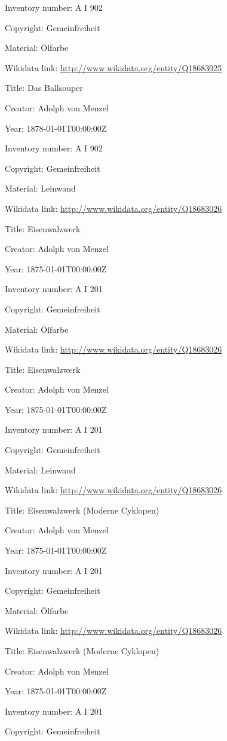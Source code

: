 \documentclass[
  letterpaper,
  DIV=11,
  numbers=noendperiod]{scrartcl}
\begin{document}
Inventory number: A I 902

Copyright: Gemeinfreiheit

Material: Ölfarbe

Wikidata link: \url{http://www.wikidata.org/entity/Q18683025}

Title: Das Ballsouper

Creator: Adolph von Menzel

Year: 1878-01-01T00:00:00Z

Inventory number: A I 902

Copyright: Gemeinfreiheit

Material: Leinwand

Wikidata link: \url{http://www.wikidata.org/entity/Q18683026}

Title: Eisenwalzwerk

Creator: Adolph von Menzel

Year: 1875-01-01T00:00:00Z

Inventory number: A I 201

Copyright: Gemeinfreiheit

Material: Ölfarbe

Wikidata link: \url{http://www.wikidata.org/entity/Q18683026}

Title: Eisenwalzwerk

Creator: Adolph von Menzel

Year: 1875-01-01T00:00:00Z

Inventory number: A I 201

Copyright: Gemeinfreiheit

Material: Leinwand

Wikidata link: \url{http://www.wikidata.org/entity/Q18683026}

Title: Eisenwalzwerk (Moderne Cyklopen)

Creator: Adolph von Menzel

Year: 1875-01-01T00:00:00Z

Inventory number: A I 201

Copyright: Gemeinfreiheit

Material: Ölfarbe

Wikidata link: \url{http://www.wikidata.org/entity/Q18683026}

Title: Eisenwalzwerk (Moderne Cyklopen)

Creator: Adolph von Menzel

Year: 1875-01-01T00:00:00Z

Inventory number: A I 201

Copyright: Gemeinfreiheit
\end{document}
